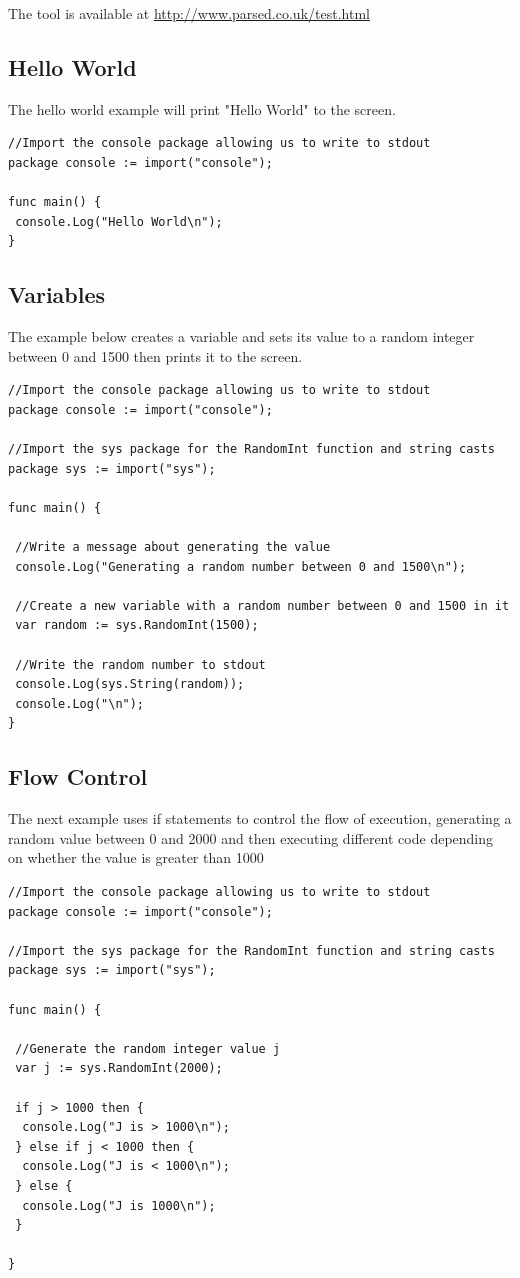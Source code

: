 \documentclass[]{final_report}
\begin{document}
The tool is available at \url{http://www.parsed.co.uk/test.html}

\subsection{Hello World}

The hello world example will print "Hello World" to the screen.

\begin{verbatim}
//Import the console package allowing us to write to stdout
package console := import("console");

func main() {
 console.Log("Hello World\n");
}
\end{verbatim}

\subsection{Variables}

The example below creates a variable and sets its value to a random integer between 0 and 1500 then prints it to the screen.

\begin{verbatim}
//Import the console package allowing us to write to stdout
package console := import("console");

//Import the sys package for the RandomInt function and string casts
package sys := import("sys");

func main() {

 //Write a message about generating the value
 console.Log("Generating a random number between 0 and 1500\n");
 
 //Create a new variable with a random number between 0 and 1500 in it
 var random := sys.RandomInt(1500);
 
 //Write the random number to stdout
 console.Log(sys.String(random));
 console.Log("\n");
}
\end{verbatim}


\subsection{Flow Control}

The next example uses if statements to control the flow of execution, generating a random value between 0 and 2000 and then executing different code depending on whether the value is greater than 1000

\begin{verbatim}
//Import the console package allowing us to write to stdout
package console := import("console");

//Import the sys package for the RandomInt function and string casts
package sys := import("sys");

func main() {

 //Generate the random integer value j
 var j := sys.RandomInt(2000);

 if j > 1000 then {
  console.Log("J is > 1000\n");
 } else if j < 1000 then {
  console.Log("J is < 1000\n");
 } else {
  console.Log("J is 1000\n");
 }

}
\end{verbatim}
\end{document}
